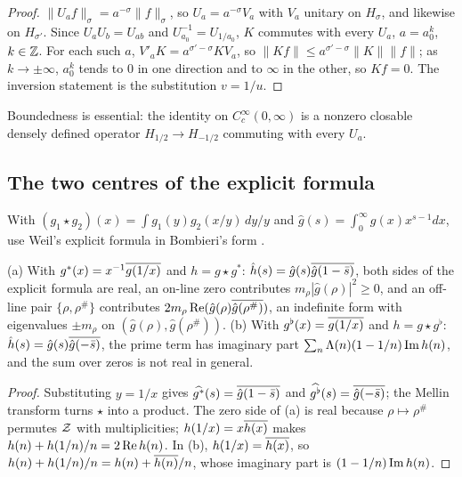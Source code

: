 \begin{proof}
$\|U_af\|_\sigma=a^{-\sigma}\|f\|_\sigma$, so $U_a=a^{-\sigma}V_a$ with $V_a$ unitary on $H_\sigma$, and likewise on $H_{\sigma'}$. Since $U_aU_b=U_{ab}$ and $U_{a_0}^{-1}=U_{1/a_0}$, $K$ commutes with every $U_{a}$, $a=a_0^k$, $k\in\mathbb{Z}$. For each such $a$, $V'_aK=a^{\sigma'-\sigma}KV_a$, so $\|Kf\|\le a^{\sigma'-\sigma}\|K\|\|f\|$; as $k\to\pm\infty$, $a_0^k$ tends to $0$ in one direction and to $\infty$ in the other, so $Kf=0$. The inversion statement is the substitution $v=1/u$.
\end{proof}

Boundedness is essential: the identity on $C_c^\infty(0,\infty)$ is a nonzero closable densely defined operator $H_{1/2}\to H_{-1/2}$ commuting with every $U_a$.

\subsection{The two centres of the explicit formula}

With $(g_1\star g_2)(x)=\int g_1(y)g_2(x/y)\,dy/y$ and $\hat g(s)=\int_0^\infty g(x)x^{s-1}dx$, use Weil's explicit formula in Bombieri's form \cite{Bombieri}.

\begin{proposition}\label{prop:centres}
(a) With $g^*(x)=x^{-1}\overline{g(1/x)}$ and $h=g\star g^*$: $\hat h(s)=\hat g(s)\overline{\hat g(1-\bar s)}$, both sides of the explicit formula are real, an on-line zero contributes $m_\rho|\hat g(\rho)|^2\ge0$, and an off-line pair $\{\rho,\rho^\#\}$ contributes $2m_\rho\operatorname{Re}(\hat g(\rho)\overline{\hat g(\rho^\#)})$, an indefinite form with eigenvalues $\pm m_\rho$ on $(\hat g(\rho),\hat g(\rho^\#))$.
(b) With $g^\flat(x)=\overline{g(1/x)}$ and $h=g\star g^\flat$: $\hat h(s)=\hat g(s)\overline{\hat g(-\bar s)}$, the prime term has imaginary part $\sum_n\Lambda(n)(1-1/n)\operatorname{Im} h(n)$, and the sum over zeros is not real in general.
\end{proposition}

\begin{proof}
Substituting $y=1/x$ gives $\widehat{g^*}(s)=\overline{\hat g(1-\bar s)}$ and $\widehat{g^\flat}(s)=\overline{\hat g(-\bar s)}$; the Mellin transform turns $\star$ into a product. The zero side of (a) is real because $\rho\mapsto\rho^\#$ permutes $\mathcal{Z}$ with multiplicities; $h(1/x)=x\overline{h(x)}$ makes $h(n)+h(1/n)/n=2\operatorname{Re} h(n)$. In (b), $h(1/x)=\overline{h(x)}$, so $h(n)+h(1/n)/n=h(n)+\overline{h(n)}/n$, whose imaginary part is $(1-1/n)\operatorname{Im} h(n)$.
\end{proof}

